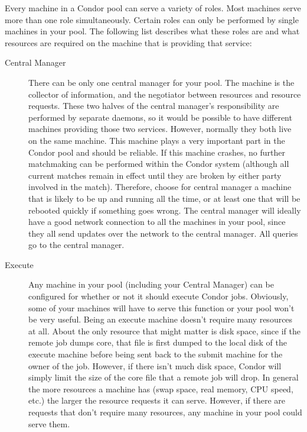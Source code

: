 Every machine in a Condor pool can serve a variety of roles.  Most
machines serve more than one role simultaneously.  Certain roles can
only be performed by single machines in your pool.  The following list
describes what these roles are and what resources are required on the
machine that is providing that service:

\begin{description} 

\item[Central Manager] There can be only one central manager for your
pool.  The machine is the collector of information, and the negotiator
between resources and resource requests.  These two halves of the
central manager's responsibility are performed by separate daemons, so
it would be possible to have different machines providing those two
services.  However, normally they both live on the same machine.  This
machine plays a very important part in the Condor pool and should be
reliable.  If this machine crashes, no further matchmaking can be
performed within the Condor system (although all current matches
remain in effect until they are broken by either party involved in the
match).  Therefore, choose for central manager
a machine that is likely to be
up and running all the time, or at least one that will be rebooted quickly if
something goes wrong.
The central manager will
ideally have a good network connection to all the
machines in your pool, since they all send updates over the network to
the central manager. All queries go to the central manager. 


\item[Execute] Any machine in your pool (including your Central
Manager) can be configured for whether or not it should execute Condor
jobs.  Obviously, some of your machines will have to serve this
function or your pool won't be very useful.  Being an execute machine
doesn't require many resources at all.  About the only resource that
might matter is disk space, since if the remote job dumps core, that
file is first dumped to the local disk of the execute machine before
being sent back to the submit machine for the owner of the job.
However, if there isn't much disk space, Condor will simply limit the
size of the core file that a remote job will drop.  In general the
more resources a machine has (swap space, real memory, CPU speed,
etc.) the larger the resource requests it can serve.  However, if
there are requests that don't require many resources, any machine
in your pool could serve them.


\end{description}

